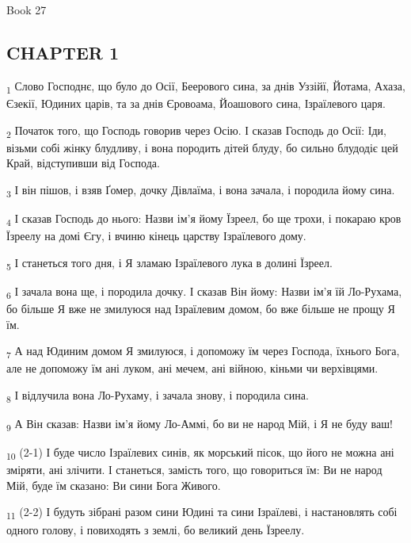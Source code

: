 Book 27
\subsection{CHAPTER 1}
\begin{tcolorbox}
\textsubscript{1} Слово Господнє, що було до Осії, Беерового сина, за днів Уззійї, Йотама, Ахаза, Єзекії, Юдиних царів, та за днів Єровоама, Йоашового сина, Ізраїлевого царя.
\end{tcolorbox}
\begin{tcolorbox}
\textsubscript{2} Початок того, що Господь говорив через Осію. І сказав Господь до Осії: Іди, візьми собі жінку блудливу, і вона породить дітей блуду, бо сильно блудодіє цей Край, відступивши від Господа.
\end{tcolorbox}
\begin{tcolorbox}
\textsubscript{3} І він пішов, і взяв Ґомер, дочку Дівлаїма, і вона зачала, і породила йому сина.
\end{tcolorbox}
\begin{tcolorbox}
\textsubscript{4} І сказав Господь до нього: Назви ім'я йому Їзреел, бо ще трохи, і покараю кров Їзреелу на домі Єгу, і вчиню кінець царству Ізраїлевого дому.
\end{tcolorbox}
\begin{tcolorbox}
\textsubscript{5} І станеться того дня, і Я зламаю Ізраїлевого лука в долині Їзреел.
\end{tcolorbox}
\begin{tcolorbox}
\textsubscript{6} І зачала вона ще, і породила дочку. І сказав Він йому: Назви ім'я їй Ло-Рухама, бо більше Я вже не змилуюся над Ізраїлевим домом, бо вже більше не прощу Я їм.
\end{tcolorbox}
\begin{tcolorbox}
\textsubscript{7} А над Юдиним домом Я змилуюся, і допоможу їм через Господа, їхнього Бога, але не допоможу їм ані луком, ані мечем, ані війною, кіньми чи верхівцями.
\end{tcolorbox}
\begin{tcolorbox}
\textsubscript{8} І відлучила вона Ло-Рухаму, і зачала знову, і породила сина.
\end{tcolorbox}
\begin{tcolorbox}
\textsubscript{9} А Він сказав: Назви ім'я йому Ло-Аммі, бо ви не народ Мій, і Я не буду ваш!
\end{tcolorbox}
\begin{tcolorbox}
\textsubscript{10} (2-1) І буде число Ізраїлевих синів, як морський пісок, що його не можна ані зміряти, ані злічити. І станеться, замість того, що говориться їм: Ви не народ Мій, буде їм сказано: Ви сини Бога Живого.
\end{tcolorbox}
\begin{tcolorbox}
\textsubscript{11} (2-2) І будуть зібрані разом сини Юдині та сини Ізраїлеві, і настановлять собі одного голову, і повиходять з землі, бо великий день Їзреелу.
\end{tcolorbox}
